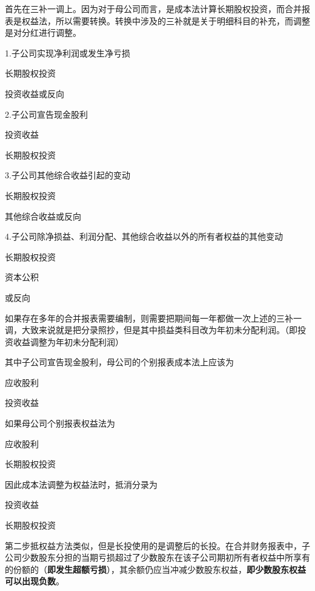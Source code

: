 \documentclass[UTF8,12pt]{ctexart}
\newenvironment{Dr}{%
	\begin{list}{}%
		{
			\setlength{\leftmargin}{2em}
			\setlength{\labelwidth}{2em}
			\setlength{\labelsep}{0pt}
			\setlength{\itemindent}{0pt}
			\setlength{\listparindent}{0pt}
			\setlength{\parsep}{0pt}
			\setlength{\topsep}{0pt}
		}
		\item[\textbf{借：}]
	}{%
	\end{list}
}
\newenvironment{Cr}{%
	\begin{list}{}%
		{
			\setlength{\leftmargin}{3em}
			\setlength{\labelwidth}{2em}
			\setlength{\labelsep}{0pt}
			\setlength{\itemindent}{0pt}
			\setlength{\listparindent}{0pt}
			\setlength{\parsep}{0pt}
			\setlength{\topsep}{0pt}
		}
		\item[\textbf{贷：}]
	}{%
	\end{list}
}
\numberwithin{equation}{section} %
\numberwithin{figure}{section}
\numberwithin{table}{section}
\begin{document}
	首先在三补一调上。因为对于母公司而言，是成本法计算长期股权投资，而合并报表是权益法，所以需要转换。转换中涉及的三补就是关于明细科目的补充，而调整是对分红进行调整。
	
	1.子公司实现净利润或发生净亏损
	\begin{Dr}
		长期股权投资
	\end{Dr}
	\begin{Cr}
		投资收益或反向
	\end{Cr}
	
	2.子公司宣告现金股利
	\begin{Dr}
		投资收益
	\end{Dr}
	\begin{Cr}
		长期股权投资
	\end{Cr}
	
	3.子公司其他综合收益引起的变动
	\begin{Dr}
		长期股权投资
	\end{Dr}
	\begin{Cr}
		其他综合收益或反向
	\end{Cr}
	
	4.子公司除净损益、利润分配、其他综合收益以外的所有者权益的其他变动
	\begin{Dr}
		长期股权投资
	\end{Dr}
	\begin{Cr}
		资本公积
	\end{Cr}
	或反向
	
	如果存在多年的合并报表需要编制，则需要把期间每一年都做一次上述的三补一调，大致来说就是把分录照抄，但是其中损益类科目改为年初未分配利润。（即投资收益调整为年初未分配利润）
	
	其中子公司宣告现金股利，母公司的个别报表成本法上应该为
	\begin{Dr}
		应收股利
	\end{Dr}
	\begin{Cr}
		投资收益
	\end{Cr}
	
	如果母公司个别报表权益法为
	\begin{Dr}
		应收股利
	\end{Dr}
	\begin{Cr}
		长期股权投资
	\end{Cr}
	因此成本法调整为权益法时，抵消分录为
	\begin{Dr}
		投资收益
	\end{Dr}
	\begin{Cr}
		长期股权投资
	\end{Cr}
	
	第二步抵权益方法类似，但是长投使用的是调整后的长投。在合并财务报表中，子公司少数股东分担的当期亏损超过了少数股东在该子公司期初所有者权益中所享有的份额的（\textbf{即发生超额亏损}），其余额仍应当冲减少数股东权益，\textbf{即少数股东权益可以出现负数}。
	
\end{document}
